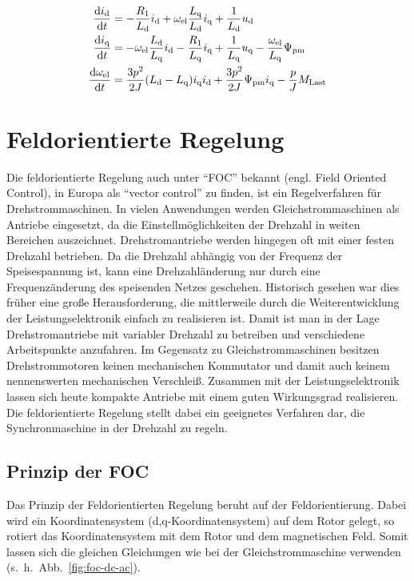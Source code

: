 \begin{align}
\frac{\mathrm{d}i_{\mathrm{d}}}{\mathrm{d}t} &= -\frac{R_{\mathrm{1}}}{L_{\mathrm{d}}}i_{\mathrm{d}}+\omega_{\mathrm{el}}\frac{L_{\mathrm{q}}}{L_{\mathrm{d}}}i_{\mathrm{q}}+\frac{1}{L_{\mathrm{d}}}u_{\mathrm{d}} \label{eqn:id_dt} \\
\frac{\mathrm{d}i_{\mathrm{q}}}{\mathrm{d}t} &= -\omega_{\mathrm{el}}\frac{L_{\mathrm{d}}}{L_{\mathrm{q}}}i_{\mathrm{d}} - \frac{R_{\mathrm{1}}}{L_{\mathrm{q}}}i_{\mathrm{q}} + \frac{1}{L_{\mathrm{q}}}u_{\mathrm{q}} - \frac{\omega_{\mathrm{el}}}{L_{\mathrm{q}}}\Psi_{\mathrm{pm}} \label{eqn:iq_dt} \\
\frac{\mathrm{d}\omega_{\mathrm{el}}}{\mathrm{d}t} &= \frac{3p^2}{2J}(L_{\mathrm{d}} - L_{\mathrm{q}})i_{\mathrm{q}} i_{\mathrm{d}} + \frac{3p^2}{2J} \Psi_{\mathrm{pm}} i_{\mathrm{q}} - \frac{p}{J} M_{\mathrm{Last}} \label{eqn:dw_dt}
\end{align}

\section{Feldorientierte Regelung}\label{sec:foc}

Die feldorientierte Regelung auch unter \enquote{FOC} bekannt (engl. Field Oriented Control), in Europa als \enquote{vector control} zu finden, ist ein Regelverfahren für Drehstrommaschinen.
In vielen Anwendungen werden Gleichstrommaschinen als Antriebe eingesetzt, da die Einstellmöglichkeiten der Drehzahl in weiten Bereichen auszeichnet.
Drehstromantriebe werden hingegen oft mit einer festen Drehzahl betrieben.
Da die Drehzahl abhängig von der Frequenz der Speisespannung ist, kann eine Drehzahländerung nur durch eine Frequenzänderung des speisenden Netzes geschehen.
Historisch gesehen war dies früher eine große Herausforderung, die mittlerweile durch die Weiterentwicklung der Leistungselektronik einfach zu realisieren ist.
Damit ist man in der Lage Drehstromantriebe mit variabler Drehzahl zu betreiben und verschiedene Arbeitspunkte anzufahren.
Im Gegensatz zu Gleichstrommaschinen besitzen Drehstrommotoren keinen mechanischen Kommutator und damit auch keinem nennenswerten mechanischen Verschleiß.
Zusammen mit der Leistungselektronik lassen sich heute kompakte Antriebe mit einem guten Wirkungsgrad realisieren.
Die feldorientierte Regelung stellt dabei ein geeignetes Verfahren dar, die Synchronmaschine in der Drehzahl zu regeln.

\subsection{Prinzip der FOC}

Das Prinzip der Feldorientierten Regelung beruht auf der Feldorientierung.
Dabei wird ein Koordinatensystem (d,q-Koordinatensystem) auf dem Rotor gelegt, so rotiert das Koordinatensystem mit dem Rotor und dem magnetischen Feld.
Somit lassen sich die gleichen Gleichungen wie bei der Gleichstrommaschine verwenden (s.~h.~Abb.~\ref{fig:foc-dc-ac}).

